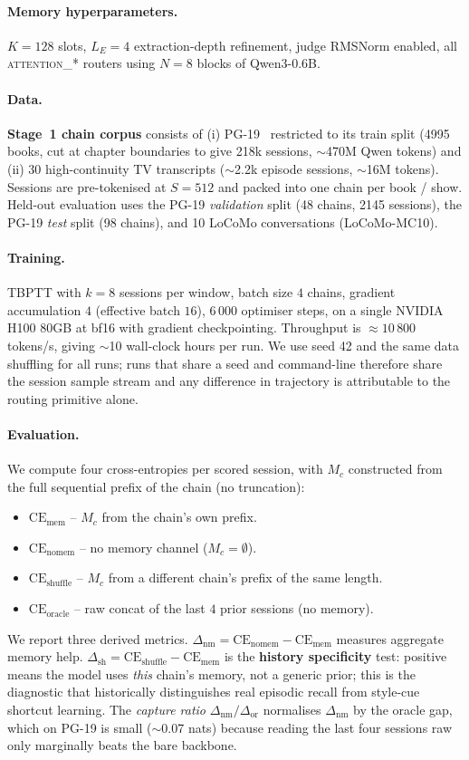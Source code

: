 \documentclass{article}
\newcommand{\dnm}{\Delta_{\text{nm}}}
\newcommand{\dsh}{\Delta_{\text{sh}}}
\newcommand{\dor}{\Delta_{\text{or}}}
\newcommand{\CEmem}{\mathrm{CE}_{\text{mem}}}
\newcommand{\CEnomem}{\mathrm{CE}_{\text{nomem}}}
\newcommand{\CEsh}{\mathrm{CE}_{\text{shuffle}}}
\newcommand{\CEor}{\mathrm{CE}_{\text{oracle}}}
\begin{document}
\paragraph{Memory hyperparameters.} $K = 128$ slots, $L_E = 4$
extraction-depth refinement, judge RMSNorm enabled, all
\textsc{attention\_*} routers using $N = 8$ blocks of Qwen3-0.6B.

\paragraph{Data.}
\textbf{Stage~1 chain corpus} consists of (i) PG-19~\cite{rae2019compressive}
restricted to its train split (4995 books, cut at chapter
boundaries to give 218k sessions, $\sim$470M Qwen tokens) and (ii) 30
high-continuity TV transcripts ($\sim$2.2k episode sessions,
$\sim$16M tokens). Sessions are pre-tokenised at $S=512$ and packed
into one chain per book / show. Held-out evaluation uses the PG-19
\emph{validation} split (48 chains, 2145 sessions), the
PG-19 \emph{test} split (98 chains), and 10 LoCoMo conversations
(LoCoMo-MC10).

\paragraph{Training.}
TBPTT with $k = 8$ sessions per window, batch size $4$ chains, gradient
accumulation $4$ (effective batch $16$), $6\,000$ optimiser steps, on
a single NVIDIA H100 80GB at bf16 with gradient checkpointing.
Throughput is $\approx\!10\,800$ tokens/s, giving $\sim$10 wall-clock hours
per run. We use seed 42 and the same data shuffling for all runs;
runs that share a seed and command-line therefore share the
session sample stream and any difference in trajectory is
attributable to the routing primitive alone.

\paragraph{Evaluation.}
We compute four cross-entropies per scored session, with $M_c$
constructed from the full sequential prefix of the chain
(no truncation):
\begin{itemize}\setlength{\itemsep}{0pt}
\item $\CEmem$ -- $M_c$ from the chain's own prefix.
\item $\CEnomem$ -- no memory channel ($M_c = \emptyset$).
\item $\CEsh$ -- $M_c$ from a different chain's prefix of the same length.
\item $\CEor$ -- raw concat of the last $4$ prior sessions (no memory).
\end{itemize}
We report three derived metrics.
$\dnm = \CEnomem - \CEmem$ measures aggregate memory help.
$\dsh = \CEsh - \CEmem$ is the \textbf{history specificity} test:
positive means the model uses \emph{this} chain's memory, not a
generic prior; this is the diagnostic that historically distinguishes
real episodic recall from style-cue shortcut learning.
The \emph{capture ratio} $\dnm / \dor$ normalises $\dnm$ by the oracle
gap, which on PG-19 is small ($\sim$0.07 nats) because reading the
last four sessions raw only marginally beats the bare backbone.
\end{document}
